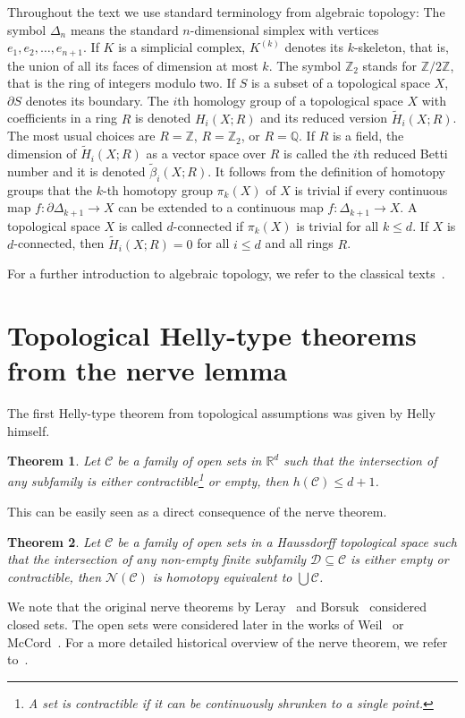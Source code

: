 \documentclass[a4paper,12pt]{amsart}
\newcommand{\R}{\mathbb{R}} 	%
\newcommand{\Z}{\mathbb{Z}} 	%
\newcommand{\Q}{\mathbb{Q}} 	%
\newtheorem{theorem}{Theorem}
\theoremstyle{definition}
\begin{document}
Throughout the text we use standard terminology from algebraic topology: The symbol $\Delta_n$ means the standard $n$-dimensional simplex with vertices $e_1,e_2,\ldots, e_{n+1}$.
If $K$ is a simplicial complex, $K^{(k)}$ denotes its $k$-skeleton, that is, the union of all its faces of dimension at most $k$. 
The symbol $\Z_2$ stands for $\Z/2\Z$, that is the ring of integers modulo two.
If $S$ is a subset of a topological space $X$,  $\partial S$ denotes its boundary.
The $i$th homology group of a topological space $X$ with coefficients in a ring $R$ is denoted $H_i(X;R)$ and its reduced version $\widetilde{H}_i(X;R)$. The most usual choices are $R=\Z$, $R=\Z_2$, or $R=\Q$.
If $R$ is a field, the dimension of $\widetilde{H}_i(X;R)$ as a vector space over $R$ is called the $i$th reduced Betti number and it is denoted $\widetilde{\beta}_i(X;R)$.
It follows from the definition of homotopy groups that the $k$-th homotopy group $\pi_k(X)$ of $X$ is trivial if every continuous map $f\colon \partial \Delta_{k+1}\to X$ can be extended to a continuous map $f\colon \Delta_{k+1}\to X$.
A topological space $X$ is called $d$-connected if $\pi_k(X)$ is trivial for all $k\leq d$.
If $X$ is $d$-connected, then $\widetilde{H}_i(X; R)=0$ for all $i\leq d$ and all rings $R$.

For a further introduction to algebraic topology, we refer to the classical texts~\cite{Hatcher:AlgebraicTopology-2002,Munkres:AlgebraicTopology-1984}.


\section{Topological Helly-type theorems from the nerve lemma}\label{sec:nerve}
The first Helly-type theorem from topological assumptions was given by Helly himself.
\begin{theorem}\cite{h-usvam-30}\label{thm:hellyTop}
Let $\mathcal C$ be a family of open sets in $\R^d$ such that the intersection of any subfamily is either contractible\footnote{A set is contractible if it can be continuously shrunken to a single point. } or empty, then $h(\mathcal C)\leq d+1$. 
\end{theorem}

This can be easily seen as a direct consequence of the nerve theorem.
\begin{theorem}\cite{nerveLeray,nerveBorsuk,nerveWeil,nerveMcCord}\label{thm:nerveLeray}
Let $\mathcal C$ be a family of open sets in a Haussdorff topological space
such that the intersection of any non-empty finite subfamily $\mathcal D\subseteq \mathcal C$ is either empty or contractible,
then $\mathcal N(\mathcal C)$ is homotopy equivalent to $\bigcup \mathcal C$.
\end{theorem}
We note that the original nerve theorems by Leray~\cite{nerveLeray} and Borsuk~\cite{nerveBorsuk} considered closed sets. 
The open sets were considered later in the works of Weil~\cite{nerveWeil} or McCord~\cite{nerveMcCord}. For a more detailed historical overview of the nerve theorem, we refer to~\cite{nerveSurvey}.
\end{document}
